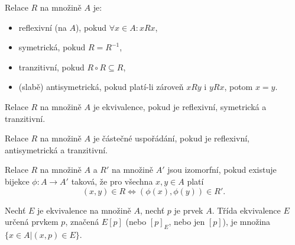 \documentclass[12pt]{article}					%
\begin{document}
    \begin{definice}
        Relace $R$ na množině $A$ je:
        \begin{itemize}
                \item reflexivní (na $A$), pokud $\forall x \in A: xRx$,
            \item symetrická, pokud $R = R^{-1}$,
            \item tranzitivní, pokud $R \circ R \subseteq R$,
            \item (slabě) antisymetrická, pokud platí-li zároveň $xRy$ i $yRx$, potom $x = y$.
        \end{itemize}
    \end{definice}

    \begin{definice}
        Relace $R$ na množině $A$ je ekvivalence, pokud je reflexivní, symetrická a tranzitivní.

        Relace $R$ na množině $A$ je částečné uspořádání, pokud je reflexivní, antisymetrická a tranzitivní.
    \end{definice}


    \begin{definice}
        Relace $R$ na množině $A$ a $R'$ na množině $A'$ jsou izomorfní, pokud existuje bijekce $\phi: A \rightarrow A'$ taková, že pro všechna $x, y \in A$ platí
        $$ (x, y) \in R \Leftrightarrow (\phi(x), \phi(y)) \in R'. $$ 
    \end{definice}

    \begin{definice}
        Nechť $E$ je ekvivalence na množině $A$, nechť $p$ je prvek $A$. Třída ekvivalence $E$ určená prvkem $p$, značená $E[p]$ (nebo $[p]_E$, nebo jen $[p]$), je množina $\{x \in A| (x, p) \in E\}$.
    \end{definice}
\end{document}
